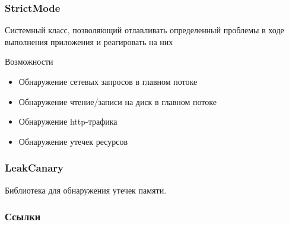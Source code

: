 \documentclass{beamer}
\begin{document}
\begin{frame}
    \frametitle{StrictMode}
    Системный класс, позволяющий отлавливать определенный проблемы в ходе
    выполнения приложения и реагировать на них
    \begin{block}{Возможности}
        \begin{itemize}
            \item{Обнаружение сетевых запросов в главном потоке}
            \item{Обнаружение чтение/записи на диск в главном потоке}
            \item{Обнаружение http-трафика}
            \item{Обнаружение утечек ресурсов}
        \end{itemize}
    \end{block}
\end{frame}

\begin{frame}
    \frametitle{LeakCanary}
    Библиотека для обнаружения утечек памяти.
\end{frame}

\begin{frame}
    \frametitle{Ссылки}
    \nocite{*}
    \RaggedRight
    \AtNextBibliography{\scriptsize}
    \printbibliography[heading=none]
\end{frame}
\end{document}
